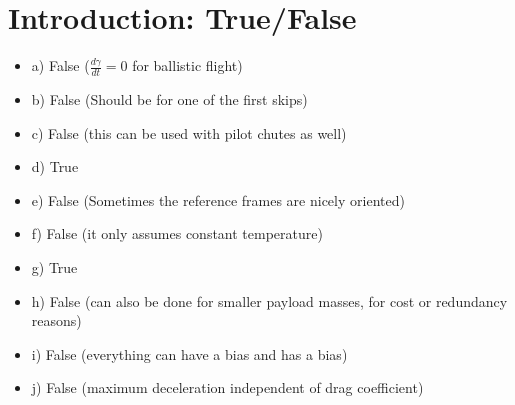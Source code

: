 \section{ Introduction: True/False }\label{sec:q1} 

\begin{itemize}
    \item a) False ($\frac{d\gamma}{dt}=0$ for ballistic flight)
    \item b) False (Should be for one of the first skips)
    \item c) False (this can be used with pilot chutes as well)
    \item d) True
    \item e) False (Sometimes the reference frames are nicely oriented)
    \item f) False (it only assumes constant temperature)
    \item g) True
    \item h) False (can also be done for smaller payload masses, for cost or redundancy reasons)
    \item i) False (everything can have a bias and has a bias)
    \item j) False (maximum deceleration independent of drag coefficient)
\end{itemize}
